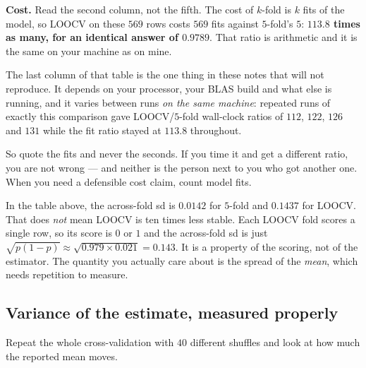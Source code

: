 \documentclass[11pt]{article}
\begin{document}
\textbf{Cost.} Read the second column, not the fifth. The cost of $k$-fold is
$k$ fits of the model, so LOOCV on these $569$ rows costs $569$ fits against
$5$-fold's $5$: \textbf{$113.8$ times as many, for an identical answer of
$0.9789$}. That ratio is arithmetic and it is the same on your machine as on
mine.

\begin{caution}
The last column of that table is the one thing in these notes that will not
reproduce. It depends on your processor, your BLAS build and what else is
running, and it varies between runs \emph{on the same machine}: repeated runs
of exactly this comparison gave LOOCV/$5$-fold wall-clock ratios of $112$,
$122$, $126$ and $131$ while the fit ratio stayed at $113.8$ throughout.

So quote the fits and never the seconds. If you time it and get a different
ratio, you are not wrong --- and neither is the person next to you who got
another one. When you need a defensible cost claim, count model fits.
\end{caution}

\begin{caution}
In the table above, the across-fold sd is $0.0142$ for $5$-fold and $0.1437$
for LOOCV. That does \emph{not} mean LOOCV is ten times less stable. Each
LOOCV fold scores a single row, so its score is $0$ or $1$ and the across-fold
sd is just $\sqrt{p(1-p)} \approx \sqrt{0.979 \times 0.021} = 0.143$. It is a
property of the scoring, not of the estimator. The quantity you actually care
about is the spread of the \emph{mean}, which needs repetition to measure.
\end{caution}

\subsection{Variance of the estimate, measured properly}

Repeat the whole cross-validation with $40$ different shuffles and look at how
much the reported mean moves.
\end{document}
